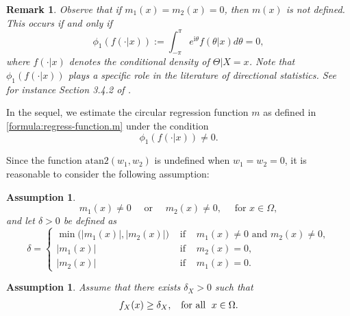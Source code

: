 \documentclass[11pt,a4paper,openany]{article}
\newtheorem{assumption}[thm]{Assumption}
\newtheorem{remark}[thm]{Remark}
\newcommand{\Atan}{\mbox{atan2}}
\begin{document}
\begin{remark}
Observe that if $m_1(x)=m_2(x)=0$, then $m(x)$ is not defined. This occurs if and only if
$$
\phi_1(f(\cdot|x)):=\int_{-\pi}^{\pi} e^{\mathrm{i}\theta}f(\theta|x) d\theta=0,
$$
where $f(\cdot|x)$ denotes the conditional density of $\Theta|X=x$. Note that $\phi_1(f(\cdot|x))$ plays a specific role in the literature of directional statistics. See for instance Section 3.4.2 of \cite{book:Mardia-Jupp}.
\end{remark}
In the sequel, we estimate the circular regression function $m$ as defined in \eqref{formula:regress-function.m} under the condition
\begin{equation}\label{not0}
\phi_1(f(\cdot|x))\not=0.
\end{equation}


Since the function $\Atan (w_{1},w_{2})$ is undefined when $w_{1} = w_{2} = 0$, it is reasonable to consider the following assumption:
\begin{assumption}\label{assumption:c_{low}} 
		\begin{equation*}
			m_1(x)\not= 0 \quad \textrm{ or } \quad m_2(x)\not= 0 , \quad \textrm{ for } x \in \Omega,  
		\end{equation*}
		and let $\delta > 0$ be defined as
		\begin{equation}\label{deltawx}
			\delta=\left\{
			\begin{array}{ccc}
				\min\big(|m_1(x)|, |m_2(x)|\big)  &\mbox{ if }   & m_1(x)\not= 0 \mbox{ and }  m_2(x)\not= 0, 
				\\[0.2cm]  
				|m_1(x)|  &\mbox{ if }   & m_2(x)= 0,  \\[0.2cm]  
				|m_2(x)|  &\mbox{ if }   & m_1(x)= 0.
			\end{array}
			\right.
			\end{equation}
\end{assumption}

\begin{assumption}
Assume that
there exists $\delta_{X} > 0$ such that
\begin{align}  
f_{X}(x) \geq \delta_{X} , \hspace{0.2cm} \textrm{ for all } \hspace{0.1cm} x \in \Omega .  
\label{assumption:assumption.on.f_X}
\end{align} 
\end{assumption}
\end{document}
